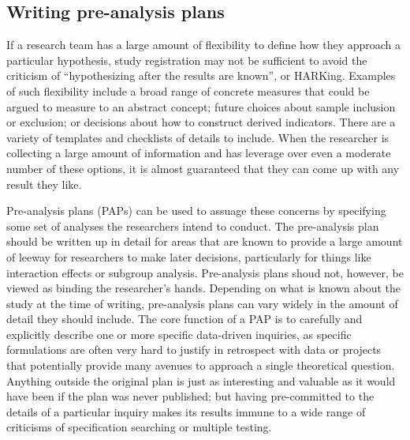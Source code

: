 \subsection{Writing pre-analysis plans}

If a research team has a large amount of flexibility
to define how they approach a particular hypothesis,
study registration may not be sufficient to avoid the criticism of
``hypothesizing after the results are known'', or HARKing.
Examples of such flexibility include a broad range
of concrete measures that could be argued to measure to an abstract concept;
future choices about sample inclusion or exclusion;
or decisions about how to construct derived indicators.
There are a variety of templates and checklists of details to include.
When the researcher is collecting a large amount of information
and has leverage over even a moderate number of these options,
it is almost guaranteed that they can come up with any result they like.

Pre-analysis plans (PAPs) can be used to assuage these concerns
by specifying some set of analyses the researchers intend to conduct.
The pre-analysis plan should be written up in detail
for areas that are known to provide a large amount of leeway
for researchers to make later decisions,
particularly for things like interaction effects or subgroup analysis.
Pre-analysis plans shoud not, however, be viewed as binding the researcher's hands.
Depending on what is known about the study at the time of writing,
pre-analysis plans can vary widely in the amount of detail they should include.
The core function of a PAP is to carefully and explicitly describe
one or more specific data-driven inquiries,
as specific formulations are often very hard to justify in retrospect
with data or projects that potentially provide many avenues to approach
a single theoretical question.
Anything outside the original plan is just as interesting and valuable
as it would have been if the plan was never published;
but having pre-committed to the details of a particular inquiry makes its results
immune to a wide range of criticisms of specification searching or multiple testing.

